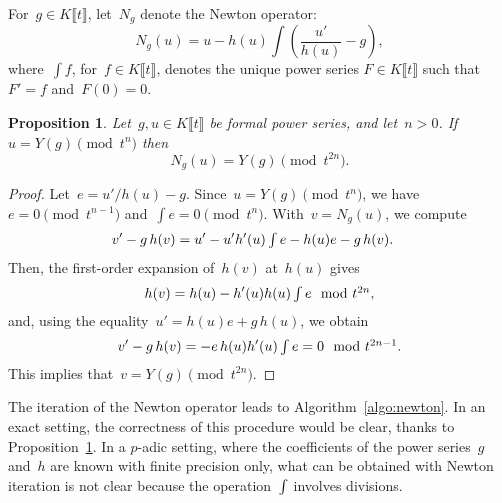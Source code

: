 \documentclass{sig-alternate}
\newtheorem{prop}[theo]{Proposition}
\theoremstyle{definition}
\theoremstyle{remark}
\newcommand\Kpt{K\llbracket t \rrbracket}
\newcommand\padic{$p$-adic\xspace}
\def\smallint{\begingroup\textstyle \int\endgroup}
\begin{document}
For~$g\in\Kpt$, let~$N_{g}$ denote the Newton operator:
\[ N_{g}(u) = u - h(u)\int \left(\frac{u'}{h(u)} - g \right), \]
where~$\int f$, for~$f\in\Kpt$, denotes the unique power series $F\in\Kpt$ such that~$F'=f$
and~$F(0)=0$.  

\begin{prop}
  \label{prop:newton-exact}
  Let~$g, u\in \Kpt$ be formal power series, and let~$n > 0$.
  If~$u = Y(g) \pmod{t^{n}}$ then
  \[ N_{g}(u) = Y(g) \pmod{t^{2n}}. \]
\end{prop}

\begin{proof} 
  Let~$e = {u'}/{h(u)} - g$.
  Since~$u = Y(g) \pmod{t^{n}}$,
  we have~$e = 0 \pmod{t^{n-1}}$ and~$\int {e} = 0 \pmod{t^n}$.
  With~$v = N_{g}(u)$, we compute
  \begin{align*}
    v' - g\, h(v) &= u' - u' h'(u) \smallint {e} - h(u) e - g\, h(v).
  \end{align*}
  Then, the first-order expansion of~$h(v)$ at~$h(u)$ gives
  \[ h(v) = h(u) - h'(u) h(u) \smallint {e} \mod{t^{2n}}, \]
  and, using the equality~$u' = h(u) e + g\, h(u)$,
  we obtain
  \[ v' - g\, h(v) = - e \, h(u) h'(u) \smallint {e} = 0 \mod{t^{2n - 1}}. \]
  This implies that~$v = Y(g) \pmod{t^{2n}}$.
\end{proof}



The iteration of the Newton operator leads to
Algorithm~\ref{algo:newton}.  In an exact setting, the correctness of
this procedure would be clear, thanks to Proposition~\ref{prop:newton-exact}.
In a \padic setting, where the coefficients of the power series~$g$ and~$h$ are
known with finite precision only, what can be obtained with Newton iteration is
not clear because the operation~$\smallint$ involves divisions.
\end{document}
